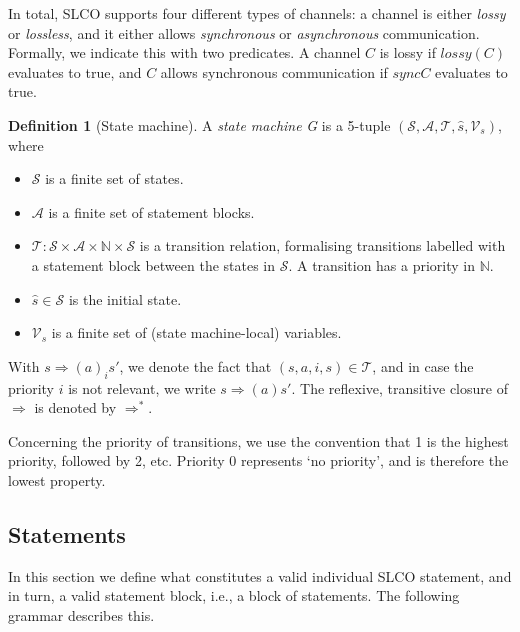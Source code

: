 \documentclass[parskip]{scrartcl}
\newcommand{\natdom} {\ensuremath{\mathds{N}}}
\newcommand{\Variables}{\mathcal{V}\xspace}
\newcommand{\States}{\mathcal{S}\xspace}
\newcommand{\Transitions}{\mathcal{T}\xspace}
\newcommand{\Actions}{\mathcal{A}\xspace}
\newcommand{\SM}{\textit{G}\xspace}
\newcommand{\sync}{\textit{sync}}
\newcommand{\lossy}{\textit{lossy}}
\theoremstyle{definition}
\newtheorem{definition}{Definition}
\begin{document}
In total, SLCO supports four different types of channels: a channel is either \emph{lossy} or \emph{lossless}, and it either allows \emph{synchronous} or \emph{asynchronous} communication. Formally, we indicate this with two predicates. A channel $C$ is lossy if $\lossy(C)$ evaluates to true, and $C$ allows synchronous communication if $\sync{C}$ evaluates to true.

\begin{definition}[State machine]
A \emph{state machine} \SM is a 5-tuple $(\States, \Actions, \Transitions, \hat s, \Variables_s)$, where
\begin{itemize}
\item $\States$ is a finite set of states.
\item $\Actions$ is a finite set of statement blocks.
\item $\Transitions: \States \times \Actions \times \natdom \times \States$ is a transition relation, formalising transitions labelled with a statement block between the states in $\States$. A transition has a priority in $\natdom$.
\item $\hat s \in \States$ is the initial state.
\item $\Variables_s$ is a finite set of (state machine-local) variables.
\end{itemize}
\end{definition}

With $s \Rightarrow(a)_i s'$, we denote the fact that $(s,a,i,s) \in \Transitions$, and in case the priority $i$ is not relevant, we write $s \Rightarrow(a) s'$. The reflexive, transitive closure of $\Rightarrow$ is denoted by $\Rightarrow^*$.

Concerning the priority of transitions, we use the convention that 1 is the highest priority, followed by 2, etc. Priority 0 represents `no priority', and is therefore the lowest property.

\subsection{Statements}

In this section we define what constitutes a valid individual SLCO statement, and in turn, a valid statement block, i.e., a block of statements. The following grammar describes this.
\end{document}
